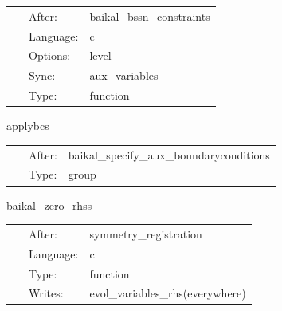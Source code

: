 \hspace{5mm}{\it register boundary conditions and perform amr+interprocessor synchronization } 


\hspace{5mm}

 \begin{tabular*}{160mm}{cll} 
~ & After:  & baikal\_bssn\_constraints \\ 
~ & Language:  & c \\ 
~ & Options:  & level \\ 
~ & Sync:  & aux\_variables \\ 
~ & Type:  & function \\ 
\end{tabular*} 


\vspace{5mm}


\hspace{5mm} applybcs 

\hspace{5mm}{\it apply registered boundary conditions } 


\hspace{5mm}

 \begin{tabular*}{160mm}{cll} 
~ & After:  & baikal\_specify\_aux\_boundaryconditions \\ 
~ & Type:  & group \\ 
\end{tabular*} 


\vspace{5mm}


\hspace{5mm} baikal\_zero\_rhss 

\hspace{5mm}{\it idea from lean: set all rhs functions to zero to prevent spurious nans } 


\hspace{5mm}

 \begin{tabular*}{160mm}{cll} 
~ & After:  & symmetry\_registration \\ 
~ & Language:  & c \\ 
~ & Type:  & function \\ 
~ & Writes:  & evol\_variables\_rhs(everywhere) \\ 
\end{tabular*} 


